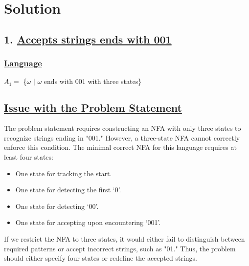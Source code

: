 \documentclass[12pt]{article}
\begin{document}
	\newpage
	\section*{Solution}
	
	\subsection*{1. \underline{Accepts strings ends with 001} } 
	\vspace{2mm}
	\subsubsection*{\underline{Language}}
	\begin{tcolorbox}[colback=white,colframe=transitioncol,arc=0mm]
		$A_1 =$ \{$\omega$ $|$ $\omega$ ends with 001 with three states\}
	\end{tcolorbox}
	
	\subsection*{\underline{Issue with the Problem Statement}}
	The problem statement requires constructing an NFA with only three states to recognize strings ending in "001." However, a three-state NFA cannot correctly enforce this condition. The minimal correct NFA for this language requires at least four states:
	
	\begin{itemize}
		\item One state for tracking the start.
		\item One state for detecting the first `0'.
		\item One state for detecting `00'.
		\item One state for accepting upon encountering `001'.
	\end{itemize}
	
	If we restrict the NFA to three states, it would either fail to distinguish between required patterns or accept incorrect strings, such as "01." Thus, the problem should either specify four states or redefine the accepted strings.
	
\end{document}
